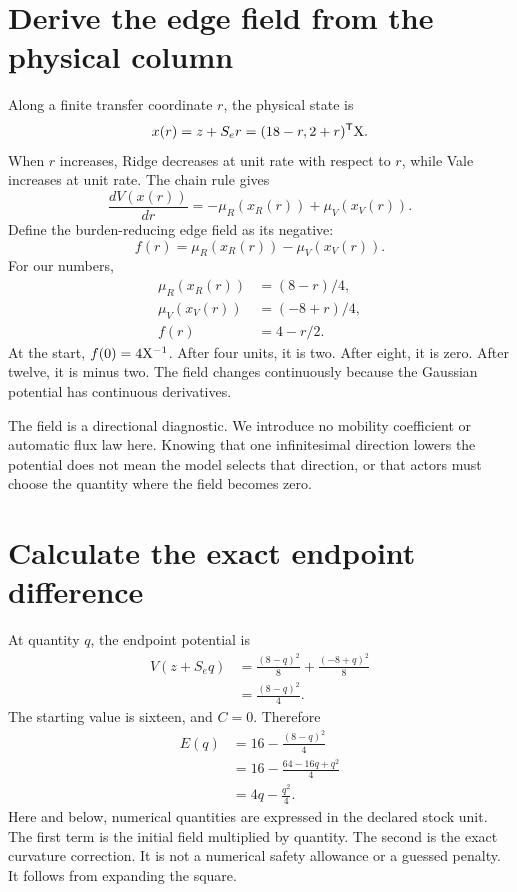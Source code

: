 \section{Derive the edge field from the physical column}

Along a finite transfer coordinate \(r\), the physical state is
\begin{equation}
x(r)=z+S_er=(18-r,2+r)^{\mathsf T}\mathrm{X}.
\end{equation}
When \(r\) increases, Ridge decreases at unit rate with respect to \(r\), while Vale increases at unit rate. The chain rule gives
\begin{equation}
\frac{dV(x(r))}{dr}=-\mu_R(x_R(r))+\mu_V(x_V(r)).
\end{equation}
Define the burden-reducing edge field as its negative:
\begin{equation}
f(r)=\mu_R(x_R(r))-\mu_V(x_V(r)).
\end{equation}
For our numbers,
\begin{align}
\mu_R(x_R(r))&=(8-r)/4,\\
\mu_V(x_V(r))&=(-8+r)/4,\\
f(r)&=4-r/2.
\end{align}
At the start, \(f(0)=4\mathrm{X}^{-1}\). After four units, it is two. After eight, it is zero. After twelve, it is minus two. The field changes continuously because the Gaussian potential has continuous derivatives.

The field is a directional diagnostic. We introduce no mobility coefficient or automatic flux law here. Knowing that one infinitesimal direction lowers the potential does not mean the model selects that direction, or that actors must choose the quantity where the field becomes zero.

\section{Calculate the exact endpoint difference}

At quantity \(q\), the endpoint potential is
\begin{align}
V(z+S_eq)
&=\frac{(8-q)^2}{8}+\frac{(-8+q)^2}{8}\\
&=\frac{(8-q)^2}{4}.
\end{align}
The starting value is sixteen, and \(C=0\). Therefore
\begin{align}
E(q)&=16-\frac{(8-q)^2}{4}\\
&=16-\frac{64-16q+q^2}{4}\\
&=4q-\frac{q^2}{4}.
\end{align}
Here and below, numerical quantities are expressed in the declared stock unit. The first term is the initial field multiplied by quantity. The second is the exact curvature correction. It is not a numerical safety allowance or a guessed penalty. It follows from expanding the square.

